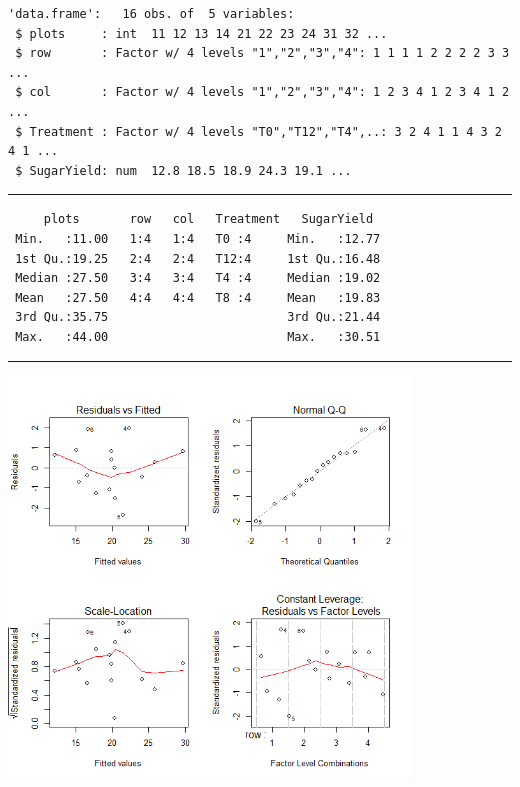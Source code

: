 \documentclass[a4paper, 10pt, fleqn, twosided]{memoir}
\begin{document}
\begin{tcolorbox}[title = Exercise 6 output continued]
\begin{verbatim}
'data.frame':   16 obs. of  5 variables:
 $ plots     : int  11 12 13 14 21 22 23 24 31 32 ...
 $ row       : Factor w/ 4 levels "1","2","3","4": 1 1 1 1 2 2 2 2 3 3 ...
 $ col       : Factor w/ 4 levels "1","2","3","4": 1 2 3 4 1 2 3 4 1 2 ...
 $ Treatment : Factor w/ 4 levels "T0","T12","T4",..: 3 2 4 1 1 4 3 2 4 1 ...
 $ SugarYield: num  12.8 18.5 18.9 24.3 19.1 ...
\end{verbatim}
{\color{outpt} {\hrule height 1pt}}
\begin{verbatim}
     plots       row   col   Treatment   SugarYield
 Min.   :11.00   1:4   1:4   T0 :4     Min.   :12.77
 1st Qu.:19.25   2:4   2:4   T12:4     1st Qu.:16.48
 Median :27.50   3:4   3:4   T4 :4     Median :19.02
 Mean   :27.50   4:4   4:4   T8 :4     Mean   :19.83
 3rd Qu.:35.75                         3rd Qu.:21.44
 Max.   :44.00                         Max.   :30.51
\end{verbatim}
{\color{outpt} {\hrule height 1pt}} \vspace{0.2cm}

\includegraphics[width=0.8\textwidth, frame]{Exercise6Resplot.png}
\end{tcolorbox}
\end{document}
